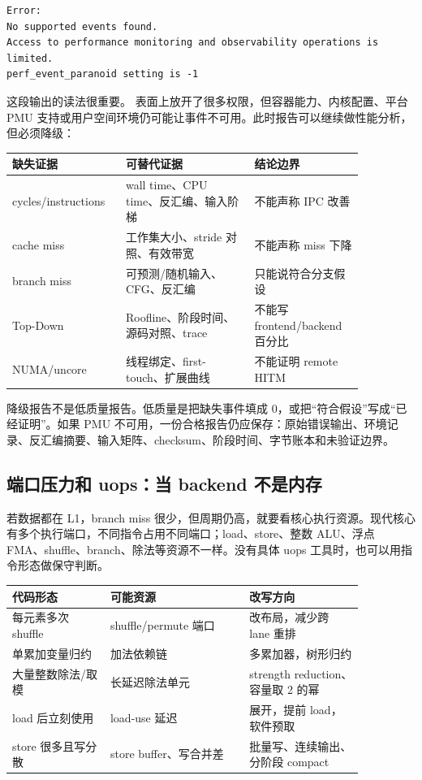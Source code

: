 \begin{lstlisting}[numbers=none,caption={PMU 不可用时的输出形态}]
Error:
No supported events found.
Access to performance monitoring and observability operations is limited.
perf_event_paranoid setting is -1
\end{lstlisting}

这段输出的读法很重要。 表面上放开了很多权限，但容器能力、内核配置、平台 PMU 支持或用户空间环境仍可能让事件不可用。此时报告可以继续做性能分析，但必须降级：

\begin{center}
\begin{tabular}{p{0.25\linewidth}p{0.33\linewidth}p{0.28\linewidth}}
\toprule
缺失证据 & 可替代证据 & 结论边界 \\
\midrule
cycles/instructions & wall time、CPU time、反汇编、输入阶梯 & 不能声称 IPC 改善 \\
cache miss & 工作集大小、stride 对照、有效带宽 & 不能声称 miss 下降 \\
branch miss & 可预测/随机输入、CFG、反汇编 & 只能说符合分支假设 \\
Top-Down & Roofline、阶段时间、源码对照、trace & 不能写 frontend/backend 百分比 \\
NUMA/uncore & 线程绑定、first-touch、扩展曲线 & 不能证明 remote HITM \\
\bottomrule
\end{tabular}
\end{center}

降级报告不是低质量报告。低质量是把缺失事件填成 0，或把“符合假设”写成“已经证明”。如果 PMU 不可用，一份合格报告仍应保存：原始错误输出、环境记录、反汇编摘要、输入矩阵、checksum、阶段时间、字节账本和未验证边界。

\subsection{端口压力和 uops：当 backend 不是内存}

若数据都在 L1，branch miss 很少，但周期仍高，就要看核心执行资源。现代核心有多个执行端口，不同指令占用不同端口；load、store、整数 ALU、浮点 FMA、shuffle、branch、除法等资源不一样。没有具体 uops 工具时，也可以用指令形态做保守判断。

\begin{center}
\begin{tabular}{p{0.24\linewidth}p{0.34\linewidth}p{0.28\linewidth}}
\toprule
代码形态 & 可能资源 & 改写方向 \\
\midrule
每元素多次 shuffle & shuffle/permute 端口 & 改布局，减少跨 lane 重排 \\
单累加变量归约 & 加法依赖链 & 多累加器，树形归约 \\
大量整数除法/取模 & 长延迟除法单元 & strength reduction、容量取 2 的幂 \\
load 后立刻使用 & load-use 延迟 & 展开，提前 load，软件预取 \\
store 很多且写分散 & store buffer、写合并差 & 批量写、连续输出、分阶段 compact \\
\bottomrule
\end{tabular}
\end{center}

